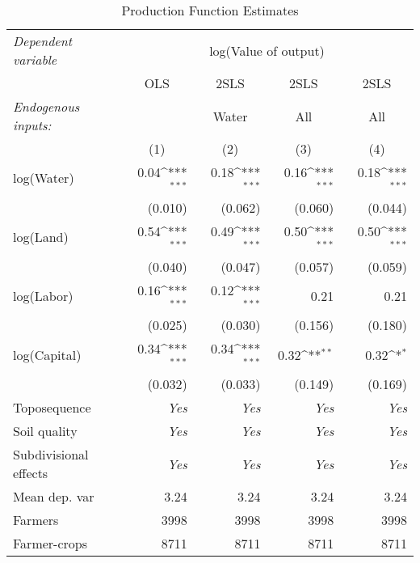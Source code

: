 \begin{table}[!ht]
	\centering
		\caption{Production Function Estimates} \label{tab:prodFunc}
	\def\sym#1{\ifmmode^{#1}\else\(^{#1}\)\fi}
	\begin{tabular}{lrrrr}
		\toprule
\multicolumn{1}{l}{\emph{Dependent variable}} &\multicolumn{4}{c}{log(Value of output)} \\
\cmidrule(lr){2-5}
&\multicolumn{1}{c}{OLS}&\multicolumn{1}{c}{2SLS}&\multicolumn{1}{c}{2SLS}&\multicolumn{1}{c}{2SLS}\\
\cmidrule(lr){2-2}\cmidrule(lr){3-3}\cmidrule(lr){4-4}\cmidrule(lr){5-5}
\multicolumn{1}{l}{\emph{Endogenous inputs:}}&\multicolumn{1}{c}{ }&\multicolumn{1}{c}{Water}&\multicolumn{1}{c}{All}&\multicolumn{1}{c}{All}\\
&\multicolumn{1}{c}{(1)}&\multicolumn{1}{c}{(2)}&\multicolumn{1}{c}{(3)}&\multicolumn{1}{c}{(4)}\\
		\midrule
		     log(Water)&0.04\sym{***}&0.18\sym{***}&0.16\sym{***}&0.18\sym{***}\\
		               &(0.010)&(0.062)&(0.060)&(0.044)\\
		 \addlinespace 
		      log(Land)&0.54\sym{***}&0.49\sym{***}&0.50\sym{***}&0.50\sym{***}\\
		               &(0.040)&(0.047)&(0.057)&(0.059)\\
		 \addlinespace 
		     log(Labor)&0.16\sym{***}&0.12\sym{***}&0.21&0.21\\
		               &(0.025)&(0.030)&(0.156)&(0.180)\\
		 \addlinespace 
		   log(Capital)&0.34\sym{***}&0.34\sym{***}&0.32\sym{**}&0.32\sym{*}\\
		               &(0.032)&(0.033)&(0.149)&(0.169)\\
		 \addlinespace 
		 \addlinespace 
		   Toposequence&\emph{Yes}&\emph{Yes}&\emph{Yes}&\emph{Yes}\\
		   Soil quality&\emph{Yes}&\emph{Yes}&\emph{Yes}&\emph{Yes}\\
		Subdivisional effects&\emph{Yes}&\emph{Yes}&\emph{Yes}&\emph{Yes}\\
		 \addlinespace 
		 \addlinespace 
		  Mean dep. var&3.24&3.24&3.24&3.24\\
		        Farmers&3998&3998&3998&3998\\
		   Farmer-crops&8711&8711&8711&8711\\
		\bottomrule

\end{tabular}
\end{table}
